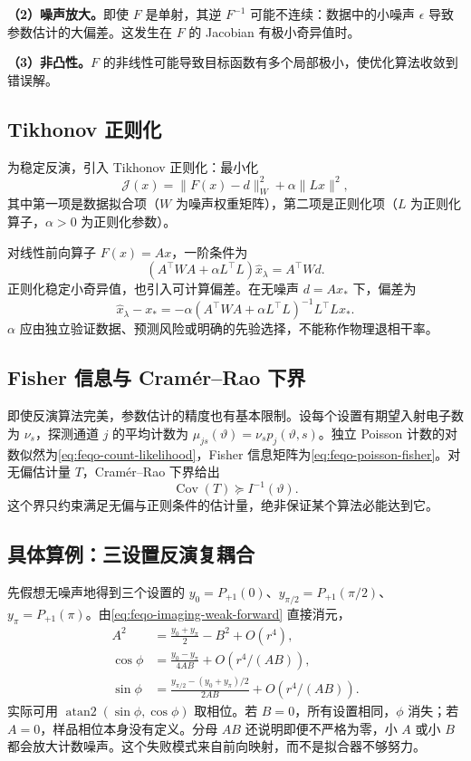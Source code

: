 \textbf{（2）噪声放大。}即使 \(F\) 是单射，其逆 \(F^{-1}\) 可能不连续：数据中的小噪声 \(\epsilon\) 导致参数估计的大偏差。这发生在 \(F\) 的 Jacobian 有极小奇异值时。

\textbf{（3）非凸性。}\(F\) 的非线性可能导致目标函数有多个局部极小，使优化算法收敛到错误解。

\subsection{Tikhonov 正则化}

为稳定反演，引入 Tikhonov 正则化：最小化
\begin{equation}
\mathcal J(x)=\|F(x)-d\|_W^2+\alpha\|Lx\|^2,
\label{eq:feqo-tikhonov-regularization}
\end{equation}
其中第一项是数据拟合项（\(W\) 为噪声权重矩阵），第二项是正则化项（\(L\) 为正则化算子，\(\alpha>0\) 为正则化参数）。

对线性前向算子 \(F(x)=Ax\)，一阶条件为
\begin{equation}
(A^\top WA+\alpha L^\top L)\hat x_\lambda=A^\top Wd.
\label{eq:feqo-tikhonov-normal}
\end{equation}
正则化稳定小奇异值，也引入可计算偏差。在无噪声 \(d=Ax_*\) 下，偏差为
\[
\hat x_\lambda-x_*=-\alpha(A^\top WA+\alpha L^\top L)^{-1}L^\top Lx_*.
\]
\(\alpha\) 应由独立验证数据、预测风险或明确的先验选择，不能称作物理退相干率。

\subsection{Fisher 信息与 Cram\'er--Rao 下界}

即使反演算法完美，参数估计的精度也有基本限制。设每个设置有期望入射电子数为 \(\nu_s\)，探测通道 \(j\) 的平均计数为 \(\mu_{js}(\vartheta)=\nu_s p_j(\vartheta,s)\)。独立 Poisson 计数的对数似然为\cref{eq:feqo-count-likelihood}，Fisher 信息矩阵为\cref{eq:feqo-poisson-fisher}。对无偏估计量 \(T\)，Cram\'er--Rao 下界给出
\begin{equation}
\operatorname{Cov}(T)\succeq I^{-1}(\vartheta).
\label{eq:feqo-cramer-rao}
\end{equation}
这个界只约束满足无偏与正则条件的估计量，绝非保证某个算法必能达到它。

\subsection{具体算例：三设置反演复耦合}

先假想无噪声地得到三个设置的 \(y_0=P_{+1}(0)\)、\(y_{\pi/2}=P_{+1}(\pi/2)\)、\(y_\pi=P_{+1}(\pi)\)。由\cref{eq:feqo-imaging-weak-forward} 直接消元，
\begin{align*}
A^2&=\frac{y_0+y_\pi}{2}-B^2+O(r^4),\\
\cos\phi&=\frac{y_0-y_\pi}{4AB}+O(r^4/(AB)),\\
\sin\phi&=\frac{y_{\pi/2}-(y_0+y_\pi)/2}{2AB}+O(r^4/(AB)).
\end{align*}
实际可用 \(\operatorname{atan2}(\sin\phi,\cos\phi)\) 取相位。若 \(B=0\)，所有设置相同，\(\phi\) 消失；若 \(A=0\)，样品相位本身没有定义。分母 \(AB\) 还说明即便不严格为零，小 \(A\) 或小 \(B\) 都会放大计数噪声。这个失败模式来自前向映射，而不是拟合器不够努力。


